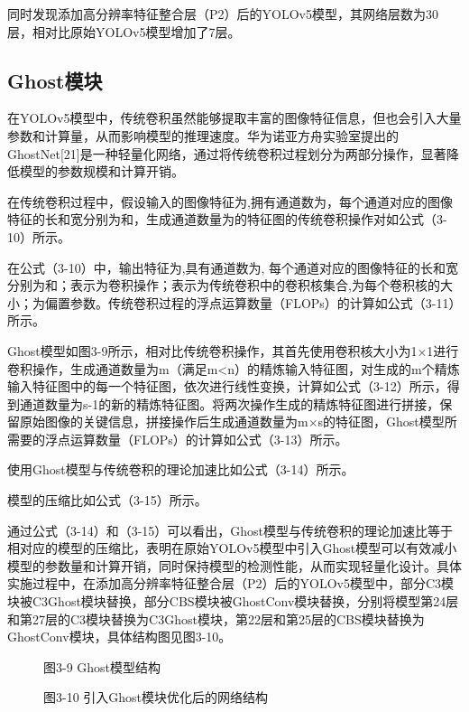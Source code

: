\documentclass[12pt, a4paper, twoside]{ctexart}
\begin{document}
同时发现添加高分辨率特征整合层（P2）后的YOLOv5模型，其网络层数为30层，相对比原始YOLOv5模型增加了7层。


\subsection{Ghost模块}

在YOLOv5模型中，传统卷积虽然能够提取丰富的图像特征信息，但也会引入大量参数和计算量，从而影响模型的推理速度。华为诺亚方舟实验室提出的GhostNet[21]是一种轻量化网络，通过将传统卷积过程划分为两部分操作，显著降低模型的参数规模和计算开销。

在传统卷积过程中，假设输入的图像特征为,拥有通道数为，每个通道对应的图像特征的长和宽分别为和，生成通道数量为的特征图的传统卷积操作对如公式（3-10）所示。

在公式（3-10）中，输出特征为,具有通道数为, 每个通道对应的图像特征的长和宽分别为和；表示为卷积操作；表示为传统卷积中的卷积核集合,为每个卷积核的大小；为偏置参数。传统卷积过程的浮点运算数量（FLOPs）的计算如公式（3-11）所示。

Ghost模型如图3-9所示，相对比传统卷积操作，其首先使用卷积核大小为1×1进行卷积操作，生成通道数量为m（满足m<n）的精炼输入特征图，对生成的m个精炼输入特征图中的每一个特征图，依次进行线性变换，计算如公式（3-12）所示，得到通道数量为s-1的新的精炼特征图。将两次操作生成的精炼特征图进行拼接，保留原始图像的关键信息，拼接操作后生成通道数量为m×s的特征图，Ghost模型所需要的浮点运算数量（FLOPs）的计算如公式（3-13）所示。

使用Ghost模型与传统卷积的理论加速比如公式（3-14）所示。

模型的压缩比如公式（3-15）所示。

通过公式（3-14）和（3-15）可以看出，Ghost模型与传统卷积的理论加速比等于相对应的模型的压缩比，表明在原始YOLOv5模型中引入Ghost模型可以有效减小模型的参数量和计算开销，同时保持模型的检测性能，从而实现轻量化设计。具体实施过程中，在添加高分辨率特征整合层（P2）后的YOLOv5模型中，部分C3模块被C3Ghost模块替换，部分CBS模块被GhostConv模块替换，分别将模型第24层和第27层的C3模块替换为C3Ghost模块，第22层和第25层的CBS模块替换为GhostConv模块，具体结构图见图3-10。


\begin{figure}[htbp]
\centering
\caption{图3-9 Ghost模型结构}
\end{figure}


\begin{figure}[htbp]
\centering
\caption{图3-10 引入Ghost模块优化后的网络结构}
\end{figure}
\end{document}
